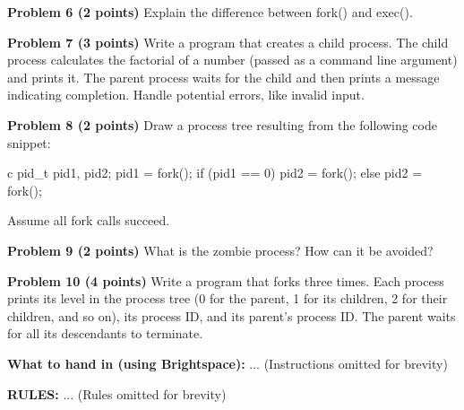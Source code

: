\documentclass{article}
\begin{document}
\textbf{Problem 6 (2 points)} Explain the difference between fork() and exec().


\textbf{Problem 7 (3 points)}  Write a program that creates a child process. The child process calculates the factorial of a number (passed as a command line argument) and prints it. The parent process waits for the child and then prints a message indicating completion. Handle potential errors, like invalid input.


\textbf{Problem 8 (2 points)} Draw a process tree resulting from the following code snippet:

c
pid_t pid1, pid2;
pid1 = fork();
if (pid1 == 0) {
  pid2 = fork();
} else {
  pid2 = fork();
}

Assume all fork calls succeed.


\textbf{Problem 9 (2 points)} What is the zombie process? How can it be avoided?


\textbf{Problem 10 (4 points)}  Write a program that forks three times. Each process prints its level in the process tree (0 for the parent, 1 for its children, 2 for their children, and so on), its process ID, and its parent's process ID.  The parent waits for all its descendants to terminate.


\textbf{What to hand in (using Brightspace): } ... (Instructions omitted for brevity)


\textbf{RULES:} ... (Rules omitted for brevity)
\end{document}
